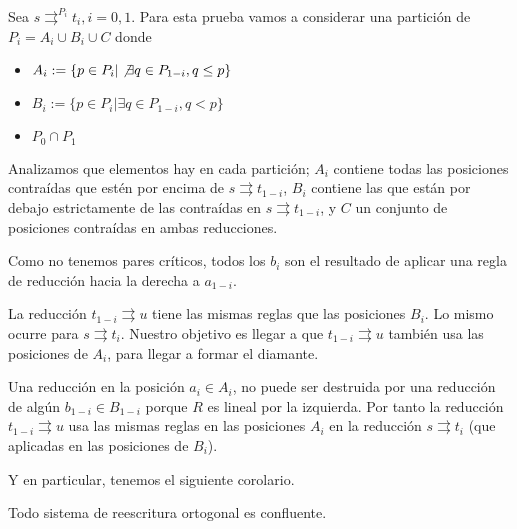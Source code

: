 \begin{demo}
  Sea $s \rightrightarrows^{P_i} t_i, i = 0,1$. Para esta prueba vamos
  a considerar una partición de $P_i = A_i \cup B_i \cup C$ donde
\begin{itemize}
\item $A_i := \{ p \in P_i | \not \exists q \in P_{1-i}, q \leq p \}$
\item $B_i := \{ p \in P_i | \exists q \in P_{1-i}, q < p \}$
\item $P_0 \cap P_1$
\end{itemize}

Analizamos que elementos hay en cada partición; $A_i$ contiene todas
las posiciones contraídas que estén por encima de
$s \rightrightarrows t_{1-i}$, $B_i$ contiene las que están por debajo
estrictamente de las contraídas en $s \rightrightarrows t_{1-i}$, y
$C$ un conjunto de posiciones contraídas en ambas reducciones.

Como no tenemos pares críticos, todos los $b_i$ son el resultado de
aplicar una regla de reducción hacia la derecha a $a_{1-i}$.

La reducción $t_{1-i} \rightrightarrows u$ tiene las mismas reglas que
las posiciones $B_i$. Lo mismo ocurre para $s \rightrightarrows
t_i$. Nuestro objetivo es llegar a que $t_{1-i} \rightrightarrows u$
también usa las posiciones de $A_i$, para llegar a formar el diamante.

Una reducción en la posición $a_i \in A_i$, no puede ser destruida por
una reducción de algún $b_{1-i} \in B_{1-i}$ porque $R$ es lineal por
la izquierda. Por tanto la reducción $t_{1-i} \rightrightarrows u$ usa
las mismas reglas en las posiciones $A_i$ en la reducción
$s \rightrightarrows t_i$ (que aplicadas en las posiciones de $B_i$).
\end{demo}

Y en particular, tenemos el siguiente corolario.

\begin{coro}
Todo sistema de reescritura ortogonal es confluente.
\end{coro}

